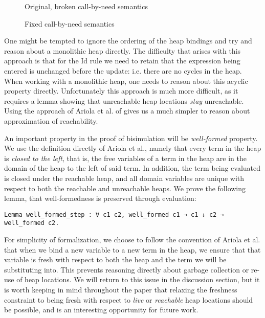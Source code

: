 \begin{figure}

\caption{Original, broken call-by-need semantics}
\label{fig:cbnbroken}
\end{figure}

\begin{figure}

\caption{Fixed call-by-need semantics}
\label{fig:cbnfixed}
\end{figure}

One might be tempted to ignore the ordering of the heap bindings and try and
reason about a monolithic heap directly. The difficulty that arises with this
approach is that for the Id rule we need to retain that the expression being
entered is unchanged before the update: i.e. there are no cycles in the heap. 
When working with a monolithic heap, one needs to reason about this acyclic
property directly. Unfortunately this approach is much more difficult, as it
requires a lemma showing that unreachable heap locations \emph{stay}
unreachable. Using the approach of Ariola et al. of gives us a much simpler to
reason about approximation of reachability. 

An important property in the proof of bisimulation will be \emph{well-formed}
property. We use the definition directly of Ariola et al., namely that every
term in the heap is \emph{closed to the left}, that is, the free variables of a
term in the heap are in the domain of the heap to the left of said term. In
addition, the term being evaluated is closed under the reachable heap, and all
domain variables are unique with respect to both the reachable and unreachable
heaps. We prove the following lemma, that well-formedness is preserved through
evaluation: 

\begin{lstlisting}
Lemma well_formed_step : ∀ c1 c2, well_formed c1 → c1 ⇓ c2 → well_formed c2.
\end{lstlisting}


For simplicity of formalization, we choose to follow the convention of Ariola et
al. that when we bind a new variable to a new term in the heap, we ensure that
that variable is fresh with respect to both the heap and the term we will be
substituting into.  This prevents reasoning directly about garbage collection
or re-use of heap locations. We will return to this issue in the discussion
section, but it is worth keeping in mind throughout the paper that relaxing the
freshness constraint to being fresh with respect to \emph{live} or
\emph{reachable} heap locations should be possible, and is an interesting
opportunity for future work. 

